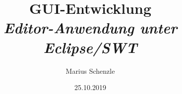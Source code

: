

\title{\textbf{GUI-Entwicklung}\\\textit{Editor-Anwendung unter Eclipse/SWT}}
\date{25.10.2019}
\author{Marius Schenzle}


\doublespacing
{}
\maketitle
\newpage
\tableofcontents
\newpage
\singlespacing
{}




